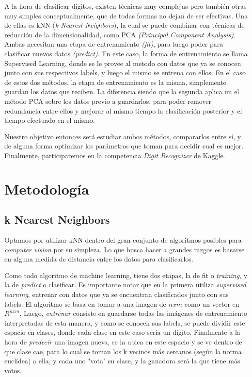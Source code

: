 \documentclass[a4paper]{article}
\begin{document}
A la hora de clasificar digitos, existen técnicas muy complejas pero también otras muy simples conceptualmente, que de todas formas no dejan de ser efectivas. Una de ellas es kNN (\textit{k Nearest Neighbors}), la cual se puede combinar con técnicas de reducción de la dimensionalidad, como PCA \textit{(Principal Component Analysis)}. Ambas necesitan una etapa de entrenamiento \textit{(fit)}, para luego poder para clasificar nuevos datos \textit{(predict)}. En este caso, la forma de entrenamiento se llama Supervised Learning, donde se le provee al metodo con datos que ya se conocen junto con sus respectivos labels, y luego el mismo se entrena con ellos. En el caso de estos dos métodos, la etapa de entrenamiento es la misma, simplemente guardan los datos que reciben. La diferencia siendo que la segunda aplica un el método PCA sobre los datos previo a guardarlos, para poder remover redundancia entre ellos y mejorar al mismo tiempo la clasificación posterior y el tiempo efectuado en el mismo.

Nuestro objetivo entonces será estudiar ambos métodos, compararlos entre sí, y de alguna forma optimizar los parámetros que toman para decidir cual es mejor. Finalmente, participaremos en la competencia \textit{Digit Recognizer} de Kaggle.

\section{Metodología}

    \subsection{k Nearest Neighbors}
    Optamos por utilizar kNN dentro del gran conjunto de algoritmos posibles para \textit{computer vision} por su simpleza. Lo que busca hacer a grandes razgos es basarse en alguna medida de distancia entre los datos para clasificarlos.
    
    Como todo algoritmo de machine learning, tiene dos etapas, la de fit o \textit{training}, y la de \textit{predict} o clasificar. Es importante notar que en la primera utiliza \textit{supervised learning}, entrenar con datos que ya se encuentran clasificados junto con sus labels. El algoritmo se basa en tomar a una imagen de $n x m$ como un vector en $R^{nxm}$. Luego, \textit{entrenar} consiste en guardarse todas las imágenes de entrenamiento interpretadas de esta manera, y como se conocen sus labels, se puede dividir este espacio en clases, donde cada clase en este caso sería un dígito. Finalmente a la hora de \textit{predecir} una imagen nueva, se la ubica en este espacio y se ve dentro de que clase cae, para lo cual se toman los k vecinos más cercanos (según la norma euclídea) a ella, y cada uno "vota" su clase, y la ganadora será la que tiene más votos.
\end{document}
